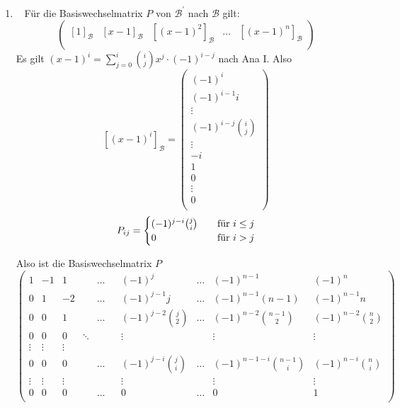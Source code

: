 \documentclass[sectionformat = aufgabe]{gadsescript}
\begin{document}
\begin{enumerate}[label=(\alph*)]
\begin{description}
		\end{description}
	\item ~
		Für die Basiswechselmatrix $ P $ von $ \mathcal{B}^\prime   $ nach $ \mathcal{B}  $ gilt:
		\[
			\begin{pmatrix} 
				[1]_{\mathcal{B} } & [x - 1]_{\mathcal{B} } & [(x - 1)^2]_{\mathcal{B} } & \hdots & [(x - 1)^n]_{\mathcal{B} } \\
			\end{pmatrix} 
		\]
		Es gilt $ (x - 1)^i = \sum_{j=0}^{i} \binom{i}{j} x^{j}  \cdot (-1)^{i - j} $ nach Ana I.
		Also
		\[
			[(x - 1)^i]_{\mathcal{B} } =
			\begin{pmatrix} 
				(-1)^{i} \\
				(-1)^{i - 1}i \\
				\vdots \\
				(-1)^{i - j} \binom{i}{j}\\
				\vdots \\
				-i \\
				1 \\
				0 \\
				\vdots \\
				0\\
			\end{pmatrix} 
		\]
		\[
			P_{ij} =
			\begin{cases}
				(-1)^{j - i} \binom{j}{i} & \quad \text{für $ i \leq j $} \\
				0 & \quad \text{für $ i > j $} 
			\end{cases}
		\]
		
		Also ist die Basiswechselmatrix $ P $
		\[
			\begin{pmatrix} 
				1 & -1 &  1 & & \hdots & & (-1)^{j}			& \hdots & (-1)^{n - 1}         & (-1)^{n} \\
				0 &  1 & -2 & & \hdots & & (-1)^{j - 1} j		& \hdots & (-1)^{n - 1} (n - 1) & (-1)^{n - 1} n\\
				0 &  0 &  1 & & \hdots & & (-1)^{j - 2} \binom{j}{2}	& \hdots & (-1)^{n - 2} \binom{n-1}{2}& (-1)^{n - 2} \binom{n}{2}\\
				0 &  0 &  0 & \ddots& & & \vdots			&        & \vdots & \vdots \\
				\vdots & \vdots & \vdots & & & & & & & \\
				0 &  0 &  0 & & \hdots & & (-1)^{j - i} \binom{j}{i}	& \hdots & (-1)^{n - 1 - i} \binom{n-1}{i} & (-1)^{n - i} \binom{n}{i}\\
				\vdots & \vdots & \vdots & & & & \vdots & & \vdots & \vdots \\
				0 &  0 &  0 & & \hdots & & 0				& \hdots & 0 &1\\
			\end{pmatrix}  
		\]
		

\end{enumerate}
\end{document}
